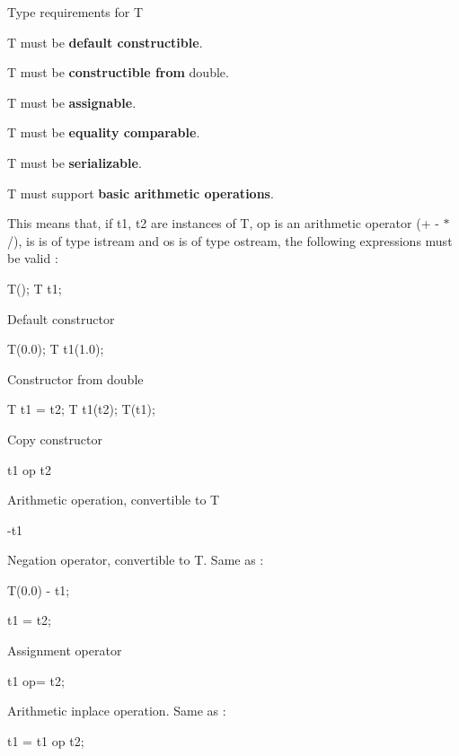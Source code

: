 \begin{DoxyParagraph}{Type requirements for T}

\begin{DoxyItemize}
\item {\ttfamily T} must be {\bfseries default constructible}.
\item {\ttfamily T} must be {\bfseries constructible from} {\ttfamily double}.
\item {\ttfamily T} must be {\bfseries assignable}.
\item {\ttfamily T} must be {\bfseries equality comparable}.
\item {\ttfamily T} must be {\bfseries serializable}.
\item {\ttfamily T} must support {\bfseries basic arithmetic operations}.
\end{DoxyItemize}This means that, if {\ttfamily t1}, {\ttfamily t2} are instances of {\ttfamily T}, {\ttfamily op} is an arithmetic operator (+ -\/ $\ast$ /), {\ttfamily is} is of type {\ttfamily istream} and {\ttfamily os} is of type {\ttfamily ostream}, the following expressions must be valid \+:
\begin{DoxyItemize}
\item 
\begin{DoxyCode}
T(); T t1; 
\end{DoxyCode}
 Default constructor
\item 
\begin{DoxyCode}
T(0.0); T t1(1.0); 
\end{DoxyCode}
 Constructor from {\ttfamily double} 
\item 
\begin{DoxyCode}
T t1 = t2; T t1(t2); T(t1); 
\end{DoxyCode}
 Copy constructor
\item 
\begin{DoxyCode}
t1 op t2 
\end{DoxyCode}
 Arithmetic operation, convertible to {\ttfamily T} 
\item 
\begin{DoxyCode}
-t1 
\end{DoxyCode}
 Negation operator, convertible to {\ttfamily T}. Same as \+:
\begin{DoxyCode}
T(0.0) - t1; 
\end{DoxyCode}

\item 
\begin{DoxyCode}
t1 = t2; 
\end{DoxyCode}
 Assignment operator
\item 
\begin{DoxyCode}
t1 op= t2; 
\end{DoxyCode}
 Arithmetic inplace operation. Same as \+:
\begin{DoxyCode}
t1 = t1 op t2; 
\end{DoxyCode}


\end{DoxyItemize}
\end{DoxyParagraph}
